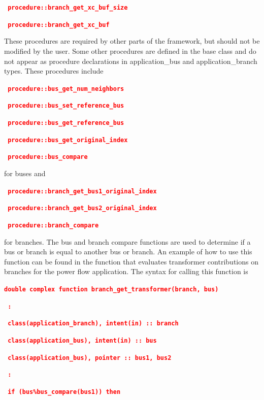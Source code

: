 \documentclass[12pt]{report} %
\begin{document}
\textcolor{red}{\texttt{\textbf{    procedure::branch\_get\_xc\_buf\_size}}}

\textcolor{red}{\texttt{\textbf{    procedure::branch\_get\_xc\_buf}}}

These procedures are required by other parts of the framework, but should not be modified by the user. Some other procedures are defined in the base class and do not appear as procedure declarations in application\_bus and application\_branch types. These procedures include

\textcolor{red}{\texttt{\textbf{    procedure::bus\_get\_num\_neighbors}}}

\textcolor{red}{\texttt{\textbf{    procedure::bus\_set\_reference\_bus}}}

\textcolor{red}{\texttt{\textbf{    procedure::bus\_get\_reference\_bus}}}

\textcolor{red}{\texttt{\textbf{    procedure::bus\_get\_original\_index}}}

\textcolor{red}{\texttt{\textbf{    procedure::bus\_compare}}}

for buses and

\textcolor{red}{\texttt{\textbf{    procedure::branch\_get\_bus1\_original\_index}}}

\textcolor{red}{\texttt{\textbf{    procedure::branch\_get\_bus2\_original\_index}}}

\textcolor{red}{\texttt{\textbf{    procedure::branch\_compare}}}

for branches. The bus and branch compare functions are used to determine if a bus or branch is equal to another bus or branch. An example of how to use this function can be found in the function that evaluates transformer contributions on branches for the power flow application. The syntax for calling this function is

\textcolor{red}{\texttt{\textbf{double complex function branch\_get\_transformer(branch, bus)}}}

\textcolor{red}{\texttt{\textbf{    :}}}

\textcolor{red}{\texttt{\textbf{  class(application\_branch), intent(in) :: branch}}}

\textcolor{red}{\texttt{\textbf{  class(application\_bus), intent(in) :: bus}}}

\textcolor{red}{\texttt{\textbf{  class(application\_bus), pointer :: bus1, bus2}}}

\textcolor{red}{\texttt{\textbf{    :}}}

\textcolor{red}{\texttt{\textbf{  if (bus\%bus\_compare(bus1)) then}}}
\end{document}
